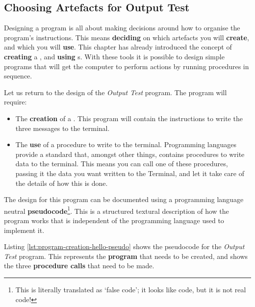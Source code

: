 \subsection{Choosing Artefacts for Output Test} %
\label{sub:choosing_artefacts_hello_world}

Designing a program is all about making decisions around how to organise the program's instructions. This means \textbf{deciding} on which artefacts you will \textbf{create}, and which you will \textbf{use}. This chapter has already introduced the concept of \textbf{creating} a , and \textbf{using} s. With these tools it is possible to design simple programs that will get the computer to perform actions by running procedures in sequence.

Let us return to the design of the \emph{Output Test} program. The program will require:

\begin{itemize}
  \item The \textbf{creation} of a . This program will contain the instructions to write the three messages to the terminal.
  \item The \textbf{use} of a procedure to write to the terminal. Programming languages provide a standard  that, amongst other things, contains procedures to write data to the terminal. This means you can call one of these procedures, passing it the data you want written to the Terminal, and let it take care of the details of how this is done.
\end{itemize}

\bigskip

The design for this program can be documented using a programming language neutral \textbf{pseudocode}\footnote{This is literally translated as `false code'; it looks like code, but it is not real code!}. This is a structured textural description of how the program works that is independent of the programming language used to implement it.

Listing \ref{lst:program-creation-hello-pseudo} shows the pseudocode for the \emph{Output Test} program. This represents the \textbf{program} that needs to be created, and shows the three \textbf{procedure calls} that need to be made. 



